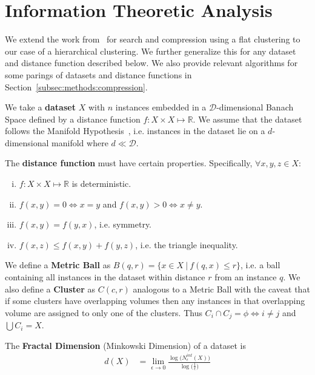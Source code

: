 \section{Information Theoretic Analysis}
\label{sec:information-theoretic-analysis}

We extend the work from~\cite{berger2020levenshtein} for search and compression using a flat clustering to our case of a hierarchical clustering.
We further generalize this for any dataset and distance function described below.
We also provide relevant algorithms for some parings of datasets and distance functions in Section~\ref{subsec:methods:compression}.

We take a \textbf{dataset} $X$ with $n$ instances embedded in a $\mathcal{D}$-dimensional Banach Space defined by a distance function $f: X \times X \mapsto \mathbb{R}$.
We assume that the dataset follows the Manifold Hypothesis~\cite{fefferman2016testing}, i.e. instances in the dataset lie on a $d$-dimensional manifold where $d \ll \mathcal{D}$.

The \textbf{distance function} must have certain properties.
Specifically, $\forall x, y, z \in X$:

\begin{enumerate}[i.]
    \item $f: X \times X \mapsto \mathbb{R}$ is deterministic.
    \item $f(x, y) = 0 \Leftrightarrow x = y$ and $f(x, y) > 0 \Leftrightarrow x \neq y$.
    \item $f(x, y) = f(y, x)$, i.e. symmetry.
    \item $f(x, z) \leq f(x, y) + f(y, z)$, i.e. the triangle inequality.
\end{enumerate}


We define a \textbf{Metric Ball} as $B(q, r) = \{ x \in X \ | \ f(q, x) \leq r \}$, i.e. a ball containing all instances in the dataset within distance $r$ from an instance $q$.
We also define a \textbf{Cluster} as $C(c, r)$ analogous to a Metric Ball with the caveat that if some clusters have overlapping volumes then any instances in that overlapping volume are assigned to only one of the clusters.
Thus $C_i \cap C_j = \phi \Leftrightarrow i \neq j$ and $\bigcup C_i = X$.

The \textbf{Fractal Dimension} (Minkowski Dimension) of a dataset is
\begin{align*}
    d(X) &= \lim_{\epsilon \rightarrow 0} \frac{\log \big( N_{\epsilon}^{int}(X) \big) }{\log \big( \frac{1}{\epsilon} \big)}
\end{align*}

